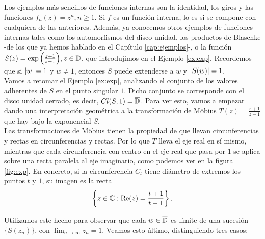 \medskip

Los ejemplos más sencillos de funciones internas son la identidad, los giros y las funciones $f_n(z) = z^n, n \geq 1$. Si $f$ es un función interna, lo es si se compone con cualquiera de las anteriores. Además, ya conocemos otros ejemplos de funciones internas tales como los automorfismos del disco unidad, los productos de Blaschke -de los que ya hemos hablado en el Capítulo \ref{cap:ejemplos}-, o la función $S(z) = \exp{\left(\frac{z + 1}{z - 1}\right)}, z \in \mathbb{D}$, que introdujimos en el Ejemplo \ref{ex:exp}. Recordemos que si $\left\lvert w\right\rvert = 1$ y $w \neq 1$, entonces $S$ puede extenderse a $w$ y $\left\lvert S(w)\right\rvert = 1$. \\


Vamos a retomar el Ejemplo \ref{ex:exp}, analizando el conjunto de los valores adherentes de $S$ en el punto singular $1$. Dicho conjunto se corresponde con el disco unidad cerrado, es decir, $Cl(S,1) = \overline{\mathbb{D}}$. Para ver esto, vamos a empezar dando una interpretación geométrica a la transformación de Möbius $T(z) = \frac{z + 1}{z - 1}$ que hay bajo la exponencial $S$. \\


Las transformaciones de Möbius tienen la propiedad de que llevan circunferencias y rectas en circunferencias y rectas. Por lo que $T$ lleva el eje real en sí mismo, mientras que cada circunferencia con centro en el eje real que pasa por $1$ se aplica sobre una recta paralela al eje imaginario, como podemos ver en la figura \ref{fig:exp}. En concreto, si la circunferencia $C_t$ tiene diámetro de extremos los puntos $t$ y $1$, su imagen es la recta
\begin{equation}
    \left\{z \in \mathbb{C} : \operatorname{Re}(z) = \frac{t + 1}{t - 1}\right\}.
\end{equation}

Utilizamos este hecho para observar que cada $w \in \overline{\mathbb{D}}$ es límite de una sucesión $\{S(z_n)\}$, con $\lim_{n \to \infty} z_n = 1$. Veamos esto último, distinguiendo tres casos:

